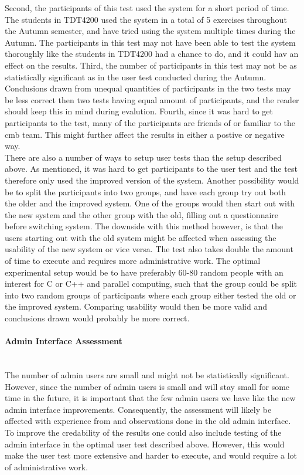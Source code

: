 Second, the participants of this test used the system for a short period of time. The students in TDT4200 used the system  in a total of 5 exercises throughout the Autumn semester, and have tried using the system multiple times during the Autumn. The participants in this test may not have been able to test the system thoroughly like the students in TDT4200 had a chance to do, and it could hav an effect on the results. Third, the number of participants in this test may not be as statistically significant as in the user test conducted during the Autumn. Conclusions drawn from unequal quantities of participants in the two tests may be less correct then two tests having equal amount of participants, and the reader should keep this in mind during evalution. Fourth, since it was hard to get participants to the test, many of the participants are friends of or familiar to the \gls{cmb} team. This might further affect the results in either a postive or negative way. \\

There are also a number of ways to setup user tests than the setup described above. As mentioned, it was hard to get participants to the user test and the test therefore only used the improved version of the system. Another possibility would be to split the participants into two groups, and have each group try out both the older and the improved system. One of the groups would then start out with the new system and the other group with the old, filling out a questionnaire before switching system. The downside with this method however, is that the users starting out with the old system might be affected when assessing the usability of the new system or vice versa. The test also takes double the amount of time to execute and requires more administrative work. The optimal experimental setup would be to have preferably 60-80 random people with an interest for C or C++ and parallel computing, such that the group could be split into two random groups of participants where each group either tested the old or the improved system. Comparing usability would then be more valid and conclusions drawn would probably be more correct.

\paragraph*{Admin Interface Assessment} \hfill \\
The number of admin users are small and might not be statistically significant. However, since the number of admin users is small and will stay small for some time in the future, it is important that the few admin users we have like the new admin interface improvements. Consequently, the assessment will likely be affected with experience from and observations done in the old admin interface. To improve the credability of the results one could also include testing of the admin interface in the optimal user test described above. However, this would make the user test more extensive and harder to execute, and would require a lot of administrative work.

